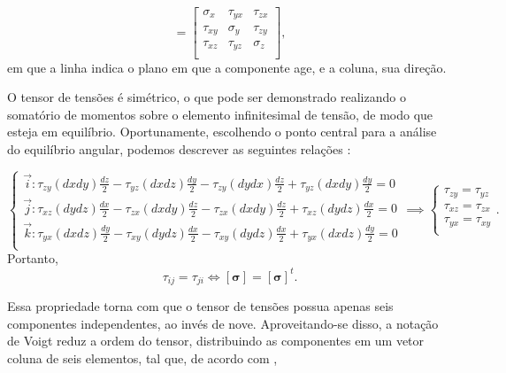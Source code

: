 \begin{equation}
    [\bm{\sigma}] =
    \begin{bmatrix}
        \sigma_x & \tau_{yx} & \tau_{zx} \\
        \tau_{xy} & \sigma_{y} & \tau_{zy} \\
        \tau_{xz} & \tau_{yz} & \sigma_{z} \\
    \end{bmatrix},
\end{equation}
em que a linha indica o plano em que a componente age, e a coluna, sua direção.

O tensor de tensões é simétrico, o que pode ser demonstrado realizando o somatório de momentos sobre o elemento infinitesimal de tensão, de modo que esteja em equilíbrio. Oportunamente, escolhendo o ponto central para a análise do equilíbrio angular, podemos descrever as seguintes relações \cite{popov}:

\begin{equation}
    \begin{cases}
        \displaystyle  \vec{i} : \tau_{zy} (dxdy) \frac{dz}{2} - \tau_{yz} (dx dz) \frac{dy}{2} - \tau_{zy} (dydx) \frac{dz}{2}+ \tau_{yz} (dxdy) \frac{dy}{2} = 0 \\

        \displaystyle  \vec{j} : \tau_{xz} (dydz) \frac{dx}{2} - \tau_{zx} (dx dy) \frac{dz}{2} - \tau_{zx} (dx dy) \frac{dz}{2} + \tau_{xz} (dydz) \frac{dx}{2} = 0 \\

        
        \displaystyle  \vec{k} : \tau_{yx} (dxdz) \frac{dy}{2} - \tau_{xy} (dydz) \frac{dx}{2} - \tau_{xy} (dydz) \frac{dx}{2} + \tau_{yx} (dxdz) \frac{dy}{2} = 0 \\

    \end{cases} \implies
    \begin{cases}
        \tau_{zy} = \tau_{yz} \\
        \tau_{xz} = \tau_{zx} \\
        \tau_{yx} = \tau_{xy} \\
    \end{cases}.
\end{equation}
Portanto,
\begin{equation}
    \tau_{ij} = \tau_{ji} \iff [\bm{\sigma}] = [\bm{\sigma}]^t.
\end{equation}

Essa propriedade torna com que o tensor de tensões possua apenas seis componentes independentes, ao invés de nove. Aproveitando-se disso, a notação de Voigt reduz a ordem do tensor, distribuindo as componentes em um vetor coluna de seis elementos, tal que, de acordo com ,

